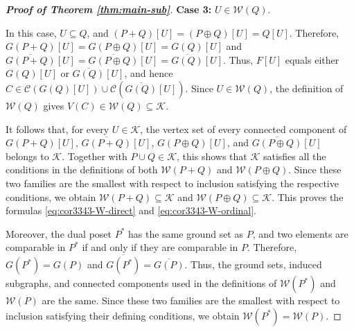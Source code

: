 \documentclass[11pt,a4paper]{article}
\begin{document}
\begin{proof}[\rm\textbf{Proof of Theorem \ref{thm:main-sub}}]
\textbf{Case 3:} $U\in\mathcal W(Q)$.

In this case, $U\subseteq Q$, and $(P+Q)[U]=(P\oplus Q)[U]=Q[U]$.
Therefore, $G(P+Q)[U]=G(P\oplus Q)[U]=G(Q)[U]$ and
$\overline{G(P+Q)}[U]=\overline{G(P\oplus Q)}[U]=\overline{G(Q)}[U]$.
Thus, $F[U]$ equals either $G(Q)[U]$ or $\overline{G(Q)}[U]$, 
and hence $C\in\mathcal C(G(Q)[U])\cup\mathcal C(\overline{G(Q)}[U])$.
Since $U\in\mathcal W(Q)$, the definition of $\mathcal W(Q)$ gives
$V(C)\in\mathcal W(Q)\subseteq\mathcal K$.

It follows that, for every $U\in\mathcal K$,
the vertex set of every connected component of
$G(P+Q)[U]$, $\overline{G(P+Q)}[U]$,
$G(P\oplus Q)[U]$, and $\overline{G(P\oplus Q)}[U]$
belongs to $\mathcal K$.
Together with $P\cup Q\in\mathcal K$,
this shows that $\mathcal K$ satisfies all the conditions
in the definitions of both $\mathcal W(P+Q)$
and $\mathcal W(P\oplus Q)$.
Since these two families are the smallest with respect
to inclusion satisfying the respective conditions,
we obtain $\mathcal W(P+Q)\subseteq\mathcal K$
and $\mathcal W(P\oplus Q)\subseteq\mathcal K$.
This proves the formulas \eqref{eq:cor3343-W-direct}
and \eqref{eq:cor3343-W-ordinal}.

Moreover, the dual poset $P^*$ has the same ground set as $P$,
and two elements are comparable in $P^*$
if and only if they are comparable in $P$.
Therefore, $G(P^*)=G(P)$ and
$\overline{G(P^*)}=\overline{G(P)}$.
Thus, the ground sets, induced subgraphs, and connected components
used in the definitions of $\mathcal W(P^*)$ and $\mathcal W(P)$
are the same.
Since these two families are the smallest with respect
to inclusion satisfying their defining conditions,
we obtain $\mathcal W(P^*)=\mathcal W(P)$.


\end{proof}
\end{document}
